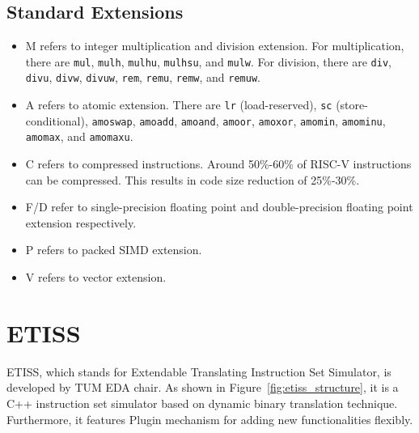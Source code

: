 \subsection{Standard Extensions}
\begin{itemize}
    \item M refers to integer multiplication and division extension. For multiplication, there are \texttt{mul}, \texttt{mulh}, \texttt{mulhu}, \texttt{mulhsu}, and \texttt{mulw}. For division, there are \texttt{div}, \texttt{divu}, \texttt{divw}, \texttt{divuw}, \texttt{rem}, \texttt{remu}, \texttt{remw}, and \texttt{remuw}.
    
    \item A refers to atomic extension. There are \texttt{lr} (load-reserved), \texttt{sc} (store-conditional), \texttt{amoswap}, \texttt{amoadd}, \texttt{amoand}, \texttt{amoor}, \texttt{amoxor}, \texttt{amomin}, \texttt{amominu}, \texttt{amomax}, and \texttt{amomaxu}.
    
    \item C refers to compressed instructions. Around 50\%-60\% of RISC-V instructions can be compressed. This results in code size reduction of 25\%-30\%.\cite{riscv_manual} 
    
    \item F/D refer to single-precision floating point and double-precision floating point extension respectively.
    
    \item P refers to packed SIMD extension.
    
    \item V refers to vector extension.
\end{itemize}

\section{ETISS}

ETISS, which stands for Extendable Translating Instruction Set Simulator, is developed by TUM EDA chair.
As shown in Figure~\ref{fig:etiss_structure}, it is a C++ instruction set simulator based on dynamic binary translation technique. Furthermore, it features Plugin mechanism for adding new functionalities flexibly.

